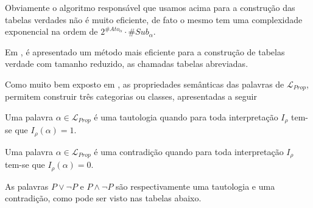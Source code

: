 Obviamente o algoritmo responsável que usamos acima para a construção das tabelas verdades não é muito eficiente, de fato o mesmo tem uma complexidade exponencial na ordem de $2^{\#Ato_\alpha} \cdot \# Sub_\alpha$.

\begin{rema}
    Em \cite{leonidas2002}, é apresentado um método mais eficiente para a construção de tabelas verdade com tamanho reduzido, as chamadas tabelas abreviadas.     
\end{rema}

Como muito bem exposto em \cite{edgar2002, nunes2008}, as propriedades semânticas das palavras de $\mathcal{L}_{Prop}$, permitem construir três categorias ou classes, apresentadas a seguir

\begin{definition}[Tautologia]
    Uma palavra $\alpha \in \mathcal{L}_{Prop}$ é uma tautologia quando para toda interpretação $I_\rho$ tem-se que $I_\rho(\alpha) = 1$.
\end{definition}

\begin{definition}[Contradição]
    Uma palavra $\alpha \in \mathcal{L}_{Prop}$ é uma contradição quando para toda interpretação $I_\rho$ tem-se que $I_\rho(\alpha) = 0$.
\end{definition}

\begin{exem}\label{exe:TautologiaContradicao}
    As palavras $P \lor \neg P$  e $P \land \neg P$ são respectivamente uma tautologia e uma contradição, como pode ser visto nas tabelas abaixo.
\end{exem}

